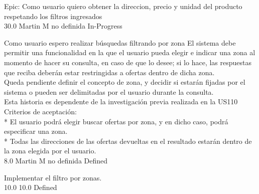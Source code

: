 \vspace{20pt}

	{Epic: Como usuario quiero obtener la direccion, precio y unidad del producto respetando los filtros ingresados} %
	{\\
} %
	{} %
	{30.0} %
	{Martin M} %
	{no definida} %
	{In-Progress} %


\vspace{20pt}

	{Como usuario espero realizar búsquedas filtrando por zona} %
	{El sistema debe permitir una funcionalidad en la que el usuario pueda elegir e
indicar una zona al momento de hacer su consulta, en caso de que lo desee; si
lo hace, las respuestas que reciba deberán estar restringidas a ofertas dentro
de dicha zona.
  \\
Queda pendiente definir el concepto de zona, y decidir si estarán fijadas por
el sistema o pueden ser delimitadas por el usuario durante la consulta.
  \\
Esta historia es dependente de la investigación previa realizada en la US110
  \\
Criterios de aceptación:\\
* El usuario podrá elegir buscar ofertas por zona, y en dicho caso, podrá especificar una zona.  \\
* Todas las direcciones de las ofertas devueltas en el resultado estarán dentro de la zona elegida por el usuario.\\
} %
	{} %
	{8.0} %
	{Martin M} %
	{no definida} %
	{Defined} %

		{Implementar el filtro por zonas.} %
		{\\
} %
		{10.0} %
		{} %
		{10.0} %
		{Defined} %


\vspace{20pt}

